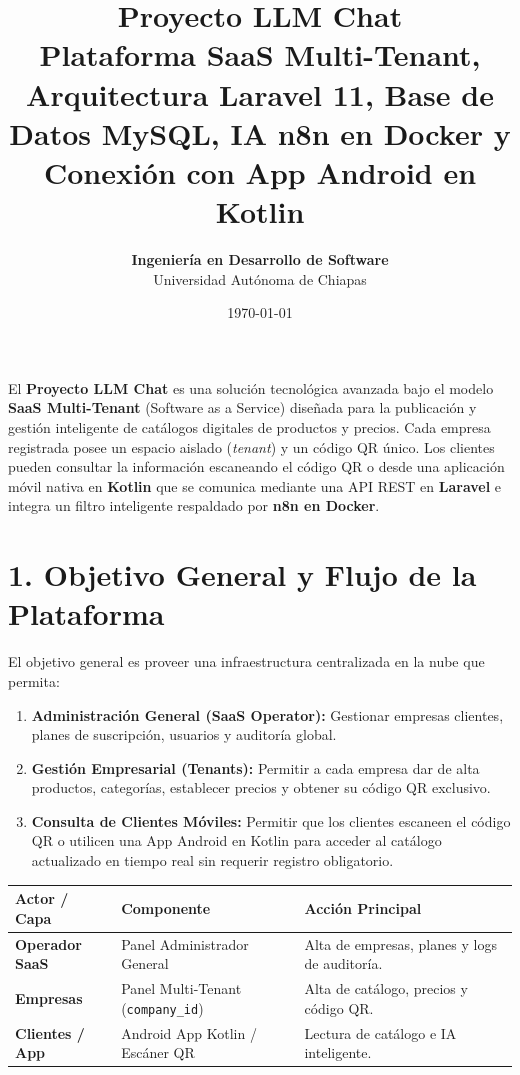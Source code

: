 \documentclass[12pt]{article}
\title{\Huge \textbf{Proyecto LLM Chat} \\ \vspace{0.4cm} \Large Plataforma SaaS Multi-Tenant, Arquitectura Laravel 11, Base de Datos MySQL, IA n8n en Docker y Conexión con App Android en Kotlin}
\author{\textbf{Ingeniería en Desarrollo de Software} \\ Universidad Autónoma de Chiapas}
\date{\today}
\begin{document}
\maketitle
\newpage

\begin{resumenbox}
El \textbf{Proyecto LLM Chat} es una solución tecnológica avanzada bajo el modelo \textbf{SaaS Multi-Tenant} (Software as a Service) diseñada para la publicación y gestión inteligente de catálogos digitales de productos y precios. Cada empresa registrada posee un espacio aislado (\emph{tenant}) y un código QR único. Los clientes pueden consultar la información escaneando el código QR o desde una aplicación móvil nativa en \textbf{Kotlin} que se comunica mediante una API REST en \textbf{Laravel} e integra un filtro inteligente respaldado por \textbf{n8n en Docker}.
\end{resumenbox}

\tableofcontents
\newpage

\section{1. Objetivo General y Flujo de la Plataforma}

El objetivo general es proveer una infraestructura centralizada en la nube que permita:
\begin{enumerate}
    \item \textbf{Administración General (SaaS Operator):} Gestionar empresas clientes, planes de suscripción, usuarios y auditoría global.
    \item \textbf{Gestión Empresarial (Tenants):} Permitir a cada empresa dar de alta productos, categorías, establecer precios y obtener su código QR exclusivo.
    \item \textbf{Consulta de Clientes Móviles:} Permitir que los clientes escaneen el código QR o utilicen una App Android en Kotlin para acceder al catálogo actualizado en tiempo real sin requerir registro obligatorio.
\end{enumerate}

\begin{center}
\begin{tabular}{lp{6cm}p{5.5cm}}
\toprule
\textbf{Actor / Capa} & \textbf{Componente} & \textbf{Acción Principal} \\
\midrule
\textbf{Operador SaaS} & Panel Administrador General & Alta de empresas, planes y logs de auditoría. \\
\textbf{Empresas} & Panel Multi-Tenant (\texttt{company\_id}) & Alta de catálogo, precios y código QR. \\
\textbf{Clientes / App} & Android App Kotlin / Escáner QR & Lectura de catálogo e IA inteligente. \\
\bottomrule
\end{tabular}
\end{center}
\end{document}
